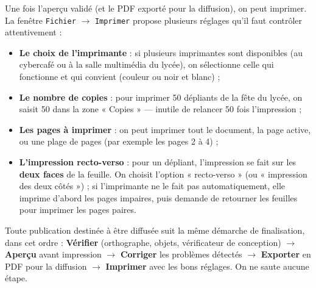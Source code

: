 \documentclass[11pt]{article}
\newcommand{\cle}[1]{{\popxbold\color{popdark}#1}}
\newcounter{popsec}
\newcounter{popsub}
\newcommand{\courssub}[1]{%
  \stepcounter{popsub}%
  \par\vspace{9pt}\noindent{\popxbold\fontsize{11.5}{13}\selectfont\color{popink}{\color{poporange}\thepopsec.\thepopsub}\hspace{6pt}#1}\par\nopagebreak\vspace{4pt}
}
\begin{document}
\courssub{Impression}

Une fois l'aperçu validé (et le PDF exporté pour la diffusion), on peut imprimer. La fenêtre \texttt{Fichier} $\rightarrow$ \texttt{Imprimer} propose plusieurs réglages qu'il faut contrôler attentivement :

\begin{itemize}
\item \textbf{Le choix de l'imprimante} : si plusieurs imprimantes sont disponibles (au cybercafé ou à la salle multimédia du lycée), on sélectionne celle qui fonctionne et qui convient (couleur ou noir et blanc) ;
\item \textbf{Le nombre de copies} : pour imprimer 50 dépliants de la fête du lycée, on saisit 50 dans la zone « Copies » — inutile de relancer 50 fois l'impression ;
\item \textbf{Les pages à imprimer} : on peut imprimer tout le document, la page active, ou une plage de pages (par exemple les pages 2 à 4) ;
\item \textbf{L'impression recto-verso} : pour un \cle{dépliant}, l'impression se fait sur les \textbf{deux faces} de la feuille. On choisit l'option « recto-verso » (ou « impression des deux côtés ») ; si l'imprimante ne le fait pas automatiquement, elle imprime d'abord les pages impaires, puis demande de retourner les feuilles pour imprimer les pages paires.
\end{itemize}

\begin{propriete}
Toute publication destinée à être diffusée suit la même démarche de finalisation, dans cet ordre : \textbf{Vérifier} (orthographe, objets, vérificateur de conception) $\rightarrow$ \textbf{Aperçu} avant impression $\rightarrow$ \textbf{Corriger} les problèmes détectés $\rightarrow$ \textbf{Exporter} en PDF pour la diffusion $\rightarrow$ \textbf{Imprimer} avec les bons réglages. On ne saute aucune étape.
\end{propriete}
\end{document}
